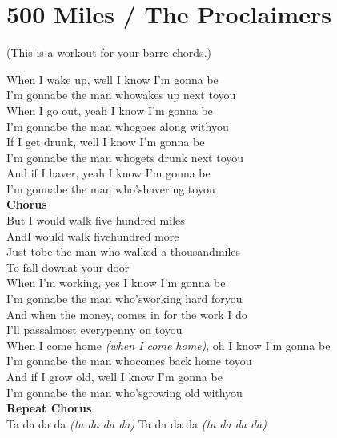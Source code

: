 \section{500 Miles / The Proclaimers}\label{sec:500miles}
{\small (This is a workout for your barre chords.)}
\DmajorEasy
\Gmajor
\Amajor
\Eminor

When I wake up, well I know I’m gonna be\\
I’m gonnabe the man whowakes up next toyou\\
When I go out, yeah I know I’m gonna be\\
I’m gonnabe the man whogoes along withyou\\
If I get drunk, well I know I’m gonna be\\
I’m gonnabe the man whogets drunk next toyou\\
And if I haver, yeah I know I’m gonna be\\
I’m gonnabe the man who’shavering toyou\\
\textbf{Chorus}\\
But I would walk five hundred miles\\
AndI would walk fivehundred more\\
Just tobe the man who walked a thousandmiles\\
To fall downat your door\\
When I’m working, yes I know I’m gonna be\\
I’m gonnabe the man who’sworking hard foryou\\
And when the money, comes in for the work I do\\
I’ll passalmost everypenny on toyou\\
When I come home \emph{(when I come home)}, oh I know I’m gonna be\\
I’m gonnabe the man whocomes back home toyou\\
And if I grow old, well I know I’m gonna be\\
I’m gonnabe the man who’sgrowing old withyou\\
\textbf{Repeat Chorus}\\
Ta da da da \emph{(ta da da da)} Ta da da da \emph{(ta da da da)}\\
